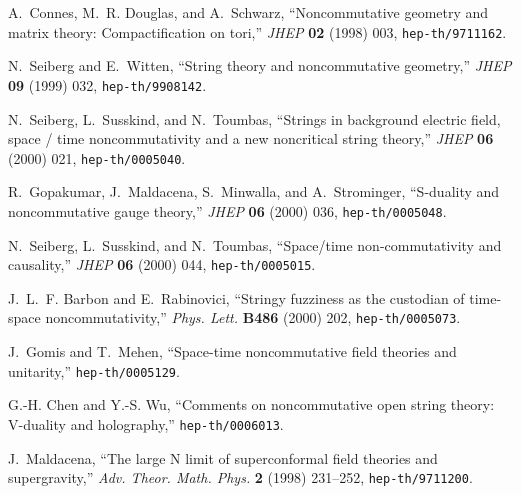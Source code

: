 \documentclass[a4paper,twoside,titlepage,12pt]{article}
\begin{document}
\providecommand{\href}[2]{#2}\begingroup\raggedright\begin{thebibliography}{10}

A.~Connes, M.~R. Douglas, and A.~Schwarz, ``Noncommutative geometry and matrix
  theory: Compactification on tori,'' {\em JHEP} {\bf 02} (1998) 003,
\href{http://www.arXiv.org/abs/hep-th/9711162}{{\tt hep-th/9711162}}.

N.~Seiberg and E.~Witten, ``String theory and noncommutative geometry,'' {\em
  JHEP} {\bf 09} (1999) 032,
\href{http://www.arXiv.org/abs/hep-th/9908142}{{\tt hep-th/9908142}}.

N.~Seiberg, L.~Susskind, and N.~Toumbas, ``Strings in background electric
  field, space / time noncommutativity and a new noncritical string theory,''
  {\em JHEP} {\bf 06} (2000) 021,
\href{http://www.arXiv.org/abs/hep-th/0005040}{{\tt hep-th/0005040}}.

R.~Gopakumar, J.~Maldacena, S.~Minwalla, and A.~Strominger, ``S-duality and
  noncommutative gauge theory,'' {\em JHEP} {\bf 06} (2000) 036,
\href{http://www.arXiv.org/abs/hep-th/0005048}{{\tt hep-th/0005048}}.

N.~Seiberg, L.~Susskind, and N.~Toumbas, ``Space/time non-commutativity and
  causality,'' {\em JHEP} {\bf 06} (2000) 044,
\href{http://www.arXiv.org/abs/hep-th/0005015}{{\tt hep-th/0005015}}.

J.~L.~F. Barbon and E.~Rabinovici, ``Stringy fuzziness as the custodian of
  time-space noncommutativity,'' {\em Phys. Lett.} {\bf B486} (2000) 202,
\href{http://www.arXiv.org/abs/hep-th/0005073}{{\tt hep-th/0005073}}.

J.~Gomis and T.~Mehen, ``Space-time noncommutative field theories and
  unitarity,''
\href{http://www.arXiv.org/abs/hep-th/0005129}{{\tt hep-th/0005129}}.

G.-H. Chen and Y.-S. Wu, ``Comments on noncommutative open string theory:
  {V-duality} and holography,''
\href{http://www.arXiv.org/abs/hep-th/0006013}{{\tt hep-th/0006013}}.

J.~Maldacena, ``The large {N} limit of superconformal field theories and
  supergravity,'' {\em Adv. Theor. Math. Phys.} {\bf 2} (1998) 231--252,
  \href{http://www.arXiv.org/abs/hep-th/9711200}{{\tt hep-th/9711200}}.


\end{thebibliography}
\end{document}
